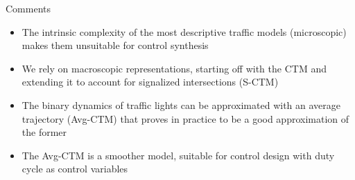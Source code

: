 \begin{frame}{Comments}
    \begin{itemize}
    \item<1-> The intrinsic complexity of the most descriptive traffic models (microscopic) makes them unsuitable for control synthesis
    \item<2-> We rely on macroscopic representations, starting off with the CTM and extending it to account for signalized intersections (S-CTM)
    \item<3-> The binary dynamics of traffic lights can be approximated with an average trajectory (Avg-CTM) that proves in practice to be a good approximation of the former
    \item<4-> The Avg-CTM is a smoother model, suitable for control design with duty cycle as control variables
    \end{itemize}
\end{frame}